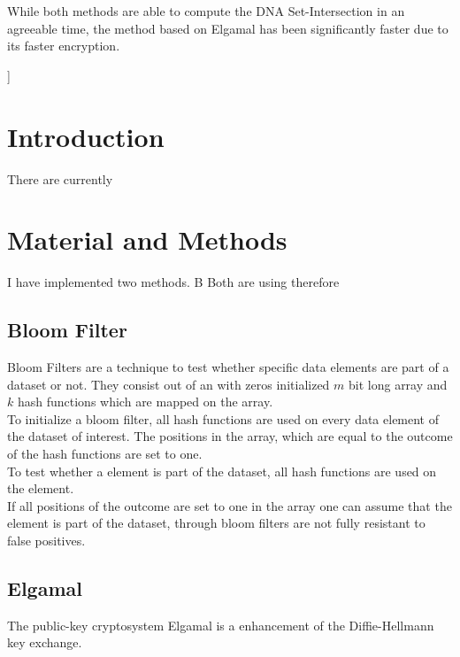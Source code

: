 \documentclass[10pt,a4paper,oneside,twocolumn]{article}
\begin{document}
While both methods are able to compute the DNA Set-Intersection in an agreeable time, the method based on Elgamal has been significantly faster due to its faster encryption.


\vspace*{8mm}
] %


\section{Introduction} 
\thispagestyle{empty}
There are currently

\section{Material and Methods} 
I have implemented two methods. B
Both are using therefore 
\subsection{Bloom Filter}

Bloom Filters are a technique to test whether specific data elements are part of a dataset or not. They consist out of an with zeros initialized $  m $ bit long array and $  k $ hash functions which are mapped on the array.\\
To initialize a bloom filter, all hash functions are used on every data element of the dataset of interest.
The positions in the array, which are equal to the outcome of the hash functions are set to one.\\
To test whether a element is part of the dataset, all hash functions are  used on the element.\\
If all positions of the outcome are set to one in the array one can assume that the element is part of the dataset, through bloom filters are not fully resistant to false positives.

\subsection{Elgamal}
The public-key cryptosystem Elgamal is a enhancement of the Diffie-Hellmann key exchange.
\end{document}
